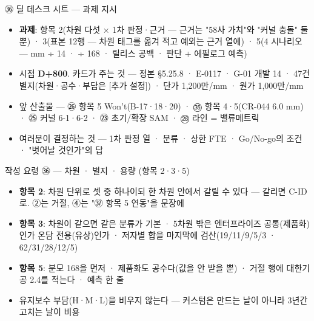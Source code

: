 \begin{frame}{㊱ 딜 데스크 시트 — 과제 지시}
\begin{itemize}
\item \textbf{과제}: 항목 2(차원 다섯 × 1차 판정·근거 — 근거는 "58사 가치"와 "커널 충돌" 둘뿐) · 3(표본 12행 — 차원 태그를 옮겨 적고 예외는 근거 열에) · 5(4 시나리오 — mm ÷ 14 · ÷ 168 · 릴리스 공백 · 판단 + 에필로그 예측)
\item 시점 \textbf{D+800}. 카드가 주는 것 — 정본 §5.2\til{}5.8 · E-01\til{}17 · G-01 개발 14 · 47건 별지(차원·공수·부담은 [추가 설정]) · 단가 1,200만/mm · 원가 1,000만/mm
\item 앞 산출물 — ㉖ 항목 5 Won't(B-17·18·20) · ㉟ 항목 4·5(CR-044 6.0 mm) · ㉕ 커널 6-1·6-2 · ㉓ 초기/확장 SAM · ㉘ 라인 = 밸류메트릭
\item 여러분이 결정하는 것 — 1차 판정 열 · 분류 · 상한 FTE · Go/No-go의 조건 · "벗어날 것인가"의 답
\end{itemize}
\end{frame}

\begin{frame}{작성 요령 ㊱ — 차원 · 별지 · 용량 (항목 2·3·5)}
\begin{itemize}
\item \textbf{항목 2}: 차원 단위로 셋 중 하나이되 한 차원 안에서 갈릴 수 있다 — 갈리면 C-ID로. ②는 거절, ④는 "㊲ 항목 5 연동"을 문장에
\item \textbf{항목 3}: 차원이 같으면 같은 분류가 기본 · 5차원 밖은 엔터프라이즈 공통(제품화)인가 온담 전용(유상)인가 · 저자별 합을 마지막에 검산(19/11/9/5/3 · 62/31/28/12/5)
\item \textbf{항목 5}: 분모 168을 먼저 · 제품화도 공수다(값을 안 받을 뿐) · 거절 행에 대한기공 2.4를 적는다 · 예측 한 줄
\item 유지보수 부담(H·M·L)을 비우지 않는다 — 커스텀은 만드는 날이 아니라 3년간 고치는 날이 비용
\end{itemize}
\end{frame}

